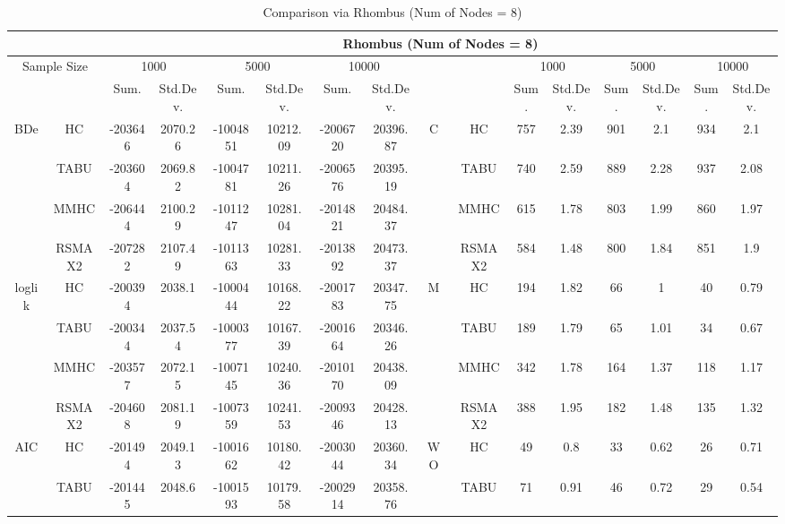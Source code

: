 \begin{table}[p]																										
\centering	\caption{Comparison via Rhombus (Num of Nodes = 8)}	\tiny																						
{\tabcolsep=0.01in																										
\begin{tabular}{cc||cc|cc|cc||cc|cc|cc|cc}																										
\hline																										
&	&	\multicolumn{14}{c}{Rhombus	(Num	of	Nodes	=	8)}\tabularnewline																			
\hline																										
\multicolumn{2}{c||}{Sample	Size}	&	\multicolumn{2}{c|}{1000}	&	\multicolumn{2}{c|}{5000}	&	\multicolumn{2}{c||}{10000}	&	&	&	\multicolumn{2}{c|}{1000}	&	\multicolumn{2}{c|}{5000}	&	\multicolumn{2}{c}{10000}\tabularnewline											
\hline																										
&	&	Sum.	&	Std.Dev.	&	Sum.	&	Std.Dev.	&	Sum.	&	Std.Dev.	&	&	&	Sum.	&	Std.Dev.	&	Sum.	&	Std.Dev.	&	Sum.	&	Std.Dev.\tabularnewline
\hline																										
\hline																										
\multirow{4}{*}{BDe} & HC &	-203646 & 	2070.26 & 	-1004851 & 	10212.09 & 	-2006720 & 	20396.87 & 	\multirow{4}{*}{C} & HC &	757 & 	2.39 & 	901 & 	2.1 & 	934 & 	2.1\tabularnewline													
& TABU &	-203604 & 	2069.82 & 	-1004781 & 	10211.26 & 	-2006576 & 	20395.19 & 	& TABU &	740 & 	2.59 & 	889 & 	2.28 & 	937 & 	2.08\tabularnewline													
& MMHC &	-206444 & 	2100.29 & 	-1011247 & 	10281.04 & 	-2014821 & 	20484.37 & 	& MMHC &	615 & 	1.78 & 	803 & 	1.99 & 	860 & 	1.97\tabularnewline													
& RSMAX2 &	-207282 & 	2107.49 & 	-1011363 & 	10281.33 & 	-2013892 & 	20473.37 & 	& RSMAX2 &	584 & 	1.48 & 	800 & 	1.84 & 	851 & 	1.9\tabularnewline													
\hline																										
\multirow{4}{*}{loglik} & HC &	-200394 & 	2038.1 & 	-1000444 & 	10168.22 & 	-2001783 & 	20347.75 & 	\multirow{4}{*}{M} & HC &	194 & 	1.82 & 	66 & 	1 & 	40 & 	0.79\tabularnewline													
& TABU &	-200344 & 	2037.54 & 	-1000377 & 	10167.39 & 	-2001664 & 	20346.26 & 	& TABU &	189 & 	1.79 & 	65 & 	1.01 & 	34 & 	0.67\tabularnewline													
& MMHC &	-203577 & 	2072.15 & 	-1007145 & 	10240.36 & 	-2010170 & 	20438.09 & 	& MMHC &	342 & 	1.78 & 	164 & 	1.37 & 	118 & 	1.17\tabularnewline													
& RSMAX2 &	-204608 & 	2081.19 & 	-1007359 & 	10241.53 & 	-2009346 & 	20428.13 & 	& RSMAX2 &	388 & 	1.95 & 	182 & 	1.48 & 	135 & 	1.32\tabularnewline													
\hline																										
\multirow{4}{*}{AIC} & HC &	-201494 & 	2049.13 & 	-1001662 & 	10180.42 & 	-2003044 & 	20360.34 & 	\multirow{4}{*}{WO} & HC &	49 & 	0.8 & 	33 & 	0.62 & 	26 & 	0.71\tabularnewline													
& TABU &	-201445 & 	2048.6 & 	-1001593 & 	10179.58 & 	-2002914 & 	20358.76 & 	& TABU &	71 & 	0.91 & 	46 & 	0.72 & 	29 & 	0.54\tabularnewline													

\end{tabular}}
\end{table}
